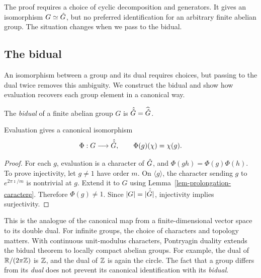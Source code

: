 \begin{rem}
The proof requires a choice of cyclic decomposition and generators. It gives
an isomorphism $G\simeq\hat{G}$, but no preferred identification for an arbitrary
finite abelian group. The situation changes when we pass to the bidual.
\end{rem}

\subsection{The bidual}
\label{sect2-bidual}

An isomorphism between a group and its dual requires choices, but passing to
the dual twice removes this ambiguity. We construct the bidual and show how
evaluation recovers each group element in a canonical way.

\begin{defn}[Bidual]
\label{notation-16}
The \emph{bidual} of a finite abelian group $G$ is
$\hat{\hat{G}}=\widehat{\hat{G}}$.
\end{defn}


\begin{prop}
Evaluation gives a canonical isomorphism
\begin{equation}
\label{eq-inj-canonical}
 \Phi:G\longrightarrow\hat{\hat{G}},\qquad
 \Phi(g)(\chi)=\chi(g).
\end{equation}
\end{prop}
\begin{proof}
For each $g$, evaluation is a character of $\hat{G}$, and
$\Phi(gh)=\Phi(g)\Phi(h)$. To prove injectivity, let $g\neq1$ have order $m$.
On $\langle g\rangle$, the character sending $g$ to $e^{2\pi\imath/m}$
is nontrivial at $g$. Extend it to $G$ using
Lemma~\ref{lem-prolongation-caractere}. Therefore $\Phi(g)\neq1$.
Since $|G|=|\hat{\hat{G}}|$, injectivity implies surjectivity.
\end{proof}


\begin{rem}
This is the analogue of the canonical map from a finite-dimensional vector
space to its double dual. For infinite groups, the choice of characters and
topology matters. With continuous unit-modulus characters, Pontryagin duality
extends the bidual theorem to locally compact abelian groups. For example,
the dual of $\mathbb{R}/(2\pi\mathbb{Z})$ is $\mathbb{Z}$, and the dual of $\mathbb{Z}$ is again the
circle. The fact that a group differs from its \emph{dual} does not prevent
its canonical identification with its \emph{bidual}.
\end{rem}

